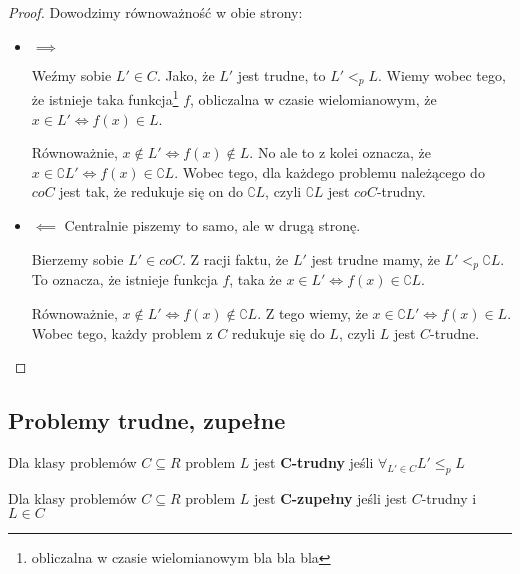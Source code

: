 \begin{proof}

	Dowodzimy równoważność w obie strony:

	\begin{itemize}
		\item     \( \implies \)

		      Weźmy sobie \( L' \in C\). Jako, że \(L'\) jest trudne, to \(L' <_{p} L\).  Wiemy wobec tego, że istnieje taka funkcja\footnote{obliczalna w czasie wielomianowym bla bla bla} \(f\), obliczalna w czasie wielomianowym, że \( x \in L' \iff f(x) \in L\).

		      Równoważnie, \( x \not\in L' \iff f(x) \not \in L\). No ale to z kolei oznacza, że \( x \in \complement{L'} \iff f(x) \in \complement{L}\). Wobec tego, dla każdego problemu należącego do \(coC\) jest tak, że redukuje się on do \( \complement{L} \), czyli \(\complement{L}\) jest \(coC\)-trudny.

		\item \( \impliedby \)
		      Centralnie piszemy to samo, ale w drugą stronę.


		      Bierzemy sobie \( L' \in coC\). Z racji faktu, że \(L'\) jest trudne mamy, że \(L' <_{p} \complement{L}\). To oznacza, że istnieje funkcja \(f\), taka że \( x \in L' \iff f(x) \in \complement{L} \).

		      Równoważnie, \( x \not \in L' \iff f(x) \not \in \complement{L} \). Z tego wiemy, że \( x \in \complement{L'} \iff f(x) \in L \). Wobec tego, każdy problem z \(C\) redukuje się do \(L\), czyli \(L\) jest \(C\)-trudne.


	\end{itemize}

\end{proof}

\subsection{Problemy trudne, zupełne}

\begin{definition}
	Dla klasy problemów \( C \subseteq R \) problem \( L \) jest \textbf{C-trudny} jeśli \( \forall_{L' \in C} L' \leq_p L \)
\end{definition}

\begin{definition}
	Dla klasy problemów \( C \subseteq R \) problem \( L \) jest \textbf{C-zupełny} jeśli jest \(C\)-trudny i \( L \in C \)
\end{definition}

